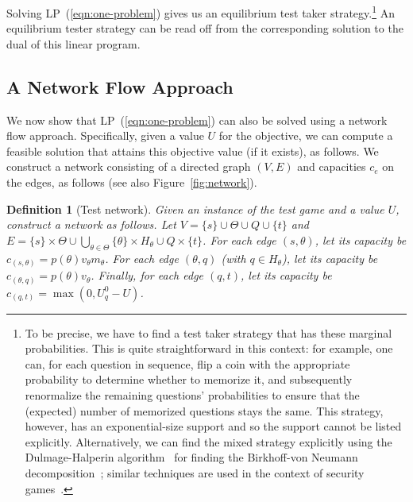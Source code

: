 \documentclass{article}
\newtheorem{definition}{Definition}
\begin{document}
Solving LP~(\ref{eqn:one-problem}) 
gives us an equilibrium test taker strategy.\footnote{To be precise, we have to
find a test taker strategy that has these marginal probabilities.
This is quite straightforward in this context: for example, one can, for
each question in sequence, flip a coin with the appropriate probability to
determine whether to memorize it, and subsequently renormalize the remaining
questions' probabilities to ensure that the (expected) number of memorized
questions stays the same.  This strategy, however, has an
exponential-size support and so the support cannot be listed explicitly.
Alternatively, we can find the mixed strategy
explicitly using the Dulmage-Halperin
algorithm~\cite{Dulmage55:Frobenius,Chang01:Birkhoff} for finding the
Birkhoff-von Neumann decomposition~\cite{Birkhoff46:Tres}; similar
techniques are used in the context of security
games~\cite{Korzhyk10:Complexity}.}
An equilibrium tester strategy can be read off from the corresponding
solution to the dual of this linear program. 

\subsection{A Network Flow Approach}

We now show that LP~(\ref{eqn:one-problem}) can also be solved using a
network flow approach.
Specifically, given a value $U$ for the objective, we can compute a
feasible solution that attains this objective value (if it exists), as
follows.  We construct a network consisting of a directed graph $(V, E)$
and capacities $c_e$ on the edges, as follows (see also
Figure~\ref{fig:network}). 

\begin{definition}[Test network]\label{def:network}
Given an instance of the  test game and a value $U$, construct a network as follows.
Let $V = \{s\} \cup \Theta \cup Q \cup \{t\}$
and 
$E = \{s\} \times \Theta \cup \bigcup_{\theta \in \Theta} \{\theta\} \times
H_\theta \cup Q \times \{t\}$.
For each edge $(s, \theta)$, let its capacity be $c_{(s,
\theta)} = p(\theta) v_\theta m_\theta$. For each edge $(\theta, q)$ (with
$q \in H_\theta$), let its
capacity be $c_{(\theta, q)} = p(\theta) v_\theta$.
Finally, for each edge $(q, t)$, let its capacity be $c_{(q, t)} = \max(0,
U_q^0-U)$.
\end{definition}
\end{document}
